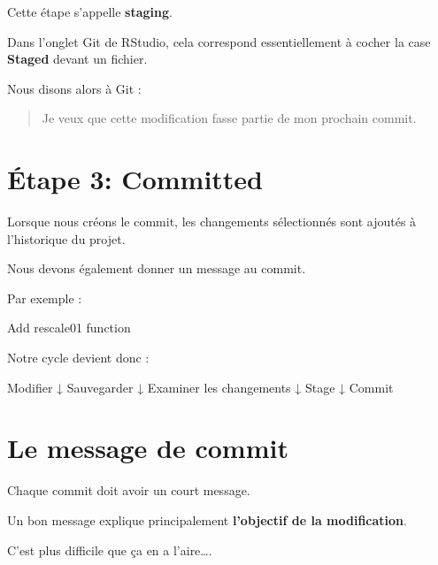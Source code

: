 \documentclass[
  letterpaper,
  DIV=11,
  numbers=noendperiod]{scrreprt}
\newenvironment{Shaded}{\begin{snugshade}}{\end{snugshade}}
\newcommand{\NormalTok}[1]{\textcolor[rgb]{0.00,0.23,0.31}{#1}}
\begin{document}
Cette étape s'appelle \textbf{staging}.

Dans l'onglet Git de RStudio, cela correspond essentiellement à cocher
la case \textbf{Staged} devant un fichier.

Nous disons alors à Git :

\begin{quote}
Je veux que cette modification fasse partie de mon prochain commit.
\end{quote}

\section*{Étape 3: Committed}\label{uxe9tape-3-committed}


Lorsque nous créons le commit, les changements sélectionnés sont ajoutés
à l'historique du projet.

Nous devons également donner un message au commit.

Par exemple :

\begin{Shaded}
\begin{Highlighting}[]
\NormalTok{Add rescale01 function}
\end{Highlighting}
\end{Shaded}

Notre cycle devient donc :

\begin{Shaded}
\begin{Highlighting}[]
\NormalTok{Modifier}
\NormalTok{   ↓}
\NormalTok{Sauvegarder}
\NormalTok{   ↓}
\NormalTok{Examiner les changements}
\NormalTok{   ↓}
\NormalTok{Stage}
\NormalTok{   ↓}
\NormalTok{Commit}
\end{Highlighting}
\end{Shaded}

\section{Le message de commit}\label{le-message-de-commit}

Chaque commit doit avoir un court message.

Un bon message explique principalement \textbf{l'objectif de la
modification}.

C'est plus difficile que ça en a l'aire\ldots.
\end{document}
